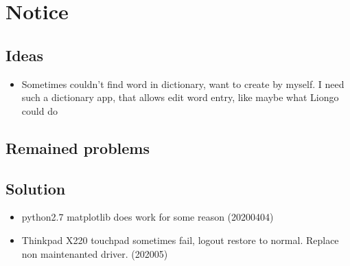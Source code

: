 \chapter{Notice}

\section{Ideas}

\begin{itemize}
\item Sometimes couldn't find word in dictionary, want to create by myself. I need such a dictionary app, that allows edit word entry, like maybe what Liongo could do 
\end{itemize}

\section{Remained problems}

\section{Solution}

\begin{itemize}
\item python2.7 matplotlib does work for some reason (20200404)
\item Thinkpad X220 touchpad sometimes fail, logout restore to normal. Replace non maintenanted driver. (202005)
\end{itemize}
